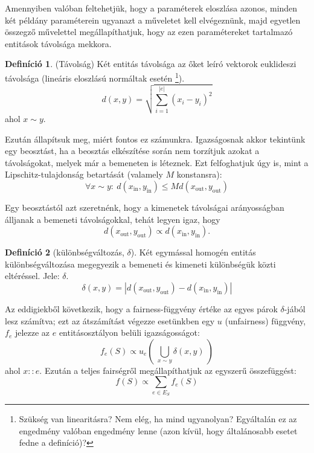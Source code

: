 \documentclass{article}
\theoremstyle{definition}
\newtheorem{definition}{Definíció}[section]
\newcommand{\subin}[1]{ {#1}_{\text{in}} }
\newcommand{\subout}[1]{ {#1}_{\text{out}} }
\begin{document}
\begin{multicols}{2}
    Amennyiben valóban feltehetjük, hogy a paraméterek eloszlása azonos, minden két példány paraméterein ugyanazt a műveletet kell elvégeznünk, majd egyetlen összegző művelettel megállapíthatjuk, hogy az ezen paramétereket tartalmazó entitások távolsága mekkora. 
    
    \begin{definition} (Távolság) \label{def:tavolsag}
        Két entitás távolsága az őket leíró vektorok euklideszi távolsága (lineáris eloszlású normáltak esetén \footnote{Szükség van linearitásra? Nem elég, ha mind ugyanolyan? Egyáltalán ez az engedmény valóban engedmény lenne (azon kívül, hogy általánosabb esetet fedne a definíció)?}).
        \begin{equation}
            d(x, y) = \sqrt{\sum_{i=1}^{|e|} (x_i - y_i)^2 } 
        \end{equation}
        ahol $x \sim y$.
    \end{definition}
    
    Ezután állapítsuk meg, miért fontos ez számunkra. Igazságosnak akkor tekintünk egy beosztást, ha a beosztás elkészítése során nem torzítjuk azokat a távolságokat, melyek már a bemeneten is léteznek. Ezt felfoghatjuk úgy is, mint a Lipschitz-tulajdonság betartását (valamely $M$ konstansra):
    \begin{equation}
        \forall x \sim y : \ d(\subin{x}, \subin{y}) \leq Md(\subout{x}, \subout{y})
    \end{equation}
    
    Egy beosztástól azt szeretnénk, hogy a kimenetek távolságai arányosságban álljanak a bemeneti távolságokkal, tehát legyen igaz, hogy
    \begin{equation}
        d(\subout x, \subout y) \propto d(\subin x, \subin y).
    \end{equation}
    
    \begin{definition}[különbségváltozás, $\delta$]
        Két egymással homogén entitás különbségváltozása megegyezik a bemeneti és kimeneti különbségük közti eltéréssel. Jele: $\delta$.
        \begin{equation}
            \delta(x, y) = |d(\subout x, \subout y) - d(\subin x, \subin y)|
        \end{equation}
    \end{definition}

    Az eddigiekből következik, hogy a fairness-függvény értéke az egyes párok $\delta$-jából lesz számítva; ezt az átszámítást végezze esetünkben egy $u$ (unfairness) függvény, $f_e$ jelezze az $e$ entitásosztályon belüli igazságosságot:
    \begin{equation}
        f_e(S) \propto u_e\left(\ \bigcup_{x \sim y} \delta(x, y)\ \right)
    \end{equation}
    ahol $x::e$. Ezután a teljes fairségről megállapíthatjuk az egyszerű összefüggést:
    \begin{equation}
        f(S) \propto \sum_{e \in E_S} f_e(S)
    \end{equation}
    

\end{multicols}
\end{document}
